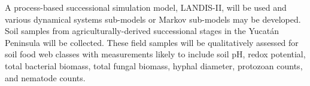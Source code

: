 A process-based successional simulation model, LANDIS-II, will be used \citep{scheller_design_2007} and various dynamical systems sub-models \citep{haefner_modeling_2005} or Markov sub-models \citep{fink_markov_2014} may be developed.\\

Soil samples from agriculturally-derived successional stages in the Yucat\'{a}n Peninsula will be collected. These field samples will be qualitatively assessed for soil food web classes with measurements likely to include soil pH, redox potential, total bacterial biomass, total fungal biomass, hyphal diameter, protozoan counts, and nematode counts.
